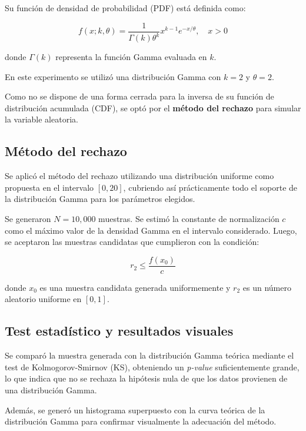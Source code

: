 \documentclass{article}
\begin{document}
Su función de densidad de probabilidad (PDF) está definida como:

\[
f(x; k, \theta) = \frac{1}{\Gamma(k)\theta^k} x^{k-1} e^{-x/\theta}, \quad x > 0
\]

donde $\Gamma(k)$ representa la función Gamma evaluada en $k$.

En este experimento se utilizó una distribución Gamma con $k = 2$ y $\theta = 2$.

Como no se dispone de una forma cerrada para la inversa de su función de distribución acumulada (CDF), se optó por el \textbf{método del rechazo} para simular la variable aleatoria.

\subsection{Método del rechazo}

Se aplicó el método del rechazo utilizando una distribución uniforme como propuesta en el intervalo $[0, 20]$, cubriendo así prácticamente todo el soporte de la distribución Gamma para los parámetros elegidos.

Se generaron $N = 10{,}000$ muestras. Se estimó la constante de normalización $c$ como el máximo valor de la densidad Gamma en el intervalo considerado. Luego, se aceptaron las muestras candidatas que cumplieron con la condición:

\[
r_2 \leq \frac{f(x_0)}{c}
\]

donde $x_0$ es una muestra candidata generada uniformemente y $r_2$ es un número aleatorio uniforme en $[0,1]$.

\subsection{Test estadístico y resultados visuales}

Se comparó la muestra generada con la distribución Gamma teórica mediante el test de Kolmogorov-Smirnov (KS), obteniendo un \textit{p-value} suficientemente grande, lo que indica que no se rechaza la hipótesis nula de que los datos provienen de una distribución Gamma.

Además, se generó un histograma superpuesto con la curva teórica de la distribución Gamma para confirmar visualmente la adecuación del método.
\end{document}
